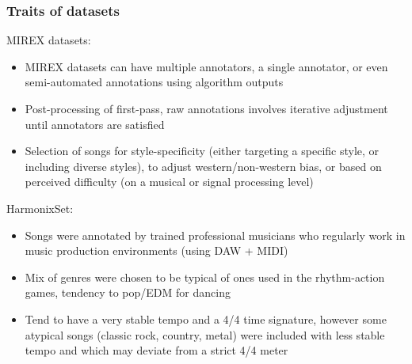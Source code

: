 \documentclass{beamer}
\begin{document}

\begin{frame}
	\frametitle{Traits of datasets}
	MIREX datasets:
	\begin{itemize}
		\item
			MIREX datasets can have multiple annotators, a single annotator, or even semi-automated annotations using algorithm outputs
		\item
			Post-processing of first-pass, raw annotations involves iterative adjustment until annotators are satisfied
		\item
			Selection of songs for style-specificity (either targeting a specific style, or including diverse styles), to adjust western/non-western bias, or based on perceived difficulty (on a musical or signal processing level)
	\end{itemize}
	HarmonixSet:
	\begin{itemize}
		\item
			Songs were annotated by trained professional musicians who regularly work in music production environments (using DAW + MIDI)
		\item
			Mix of genres were chosen to be typical of ones used in the rhythm-action games, tendency to pop/EDM for dancing
		\item
			Tend to have a very stable tempo and a 4/4 time signature, however some atypical songs (classic rock, country, metal) were included with less stable tempo and which may deviate from a strict 4/4 meter
	\end{itemize}
\end{frame}

\end{document}
